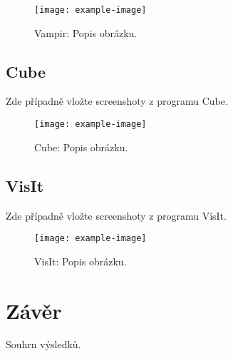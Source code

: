 \documentclass{article}
\begin{document}
\begin{figure}[H]
    \centering
    \texttt{[image: example-image]}
    \caption{Vampir: Popis obrázku.}
    \label{fig:vampir} 
\end{figure}

\subsection{Cube}
\label{subsec:cube}

Zde případně vložte screenshoty z programu Cube.

\begin{figure}[H]
    \centering
    \texttt{[image: example-image]}
    \caption{Cube: Popis obrázku.}
    \label{fig:cube} 
\end{figure}

\subsection{VisIt}
\label{subsec:visit}

Zde případně vložte screenshoty z programu VisIt.

\begin{figure}[H]
    \centering
    \texttt{[image: example-image]}
    \caption{VisIt: Popis obrázku.}
    \label{fig:visit} 
\end{figure}

\section{Závěr}
\label{sec:zaver}
Souhrn výsledků.
\end{document}
